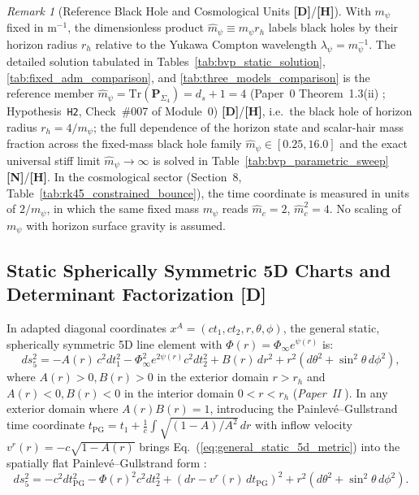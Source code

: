 \documentclass[11pt,a4paper]{article}
\newcommand{\catD}{\textbf{\textcolor{blue!75!black}{[D]}}}
\newcommand{\catH}{\textbf{\textcolor{orange!85!black}{[H]}}}
\newcommand{\catN}{\textbf{\textcolor{teal!75!black}{[N]}}}
\theoremstyle{definition}
\theoremstyle{remark}
\newtheorem{remark}[theorem]{Remark}
\begin{document}
\begin{remark}[Reference Black Hole and Cosmological Units \catD/\catH]
\label{rem:units}
With $m_\psi$ fixed in $\text{m}^{-1}$, the dimensionless product $\hat{m}_\psi \equiv m_\psi r_h$ labels black holes by their horizon radius $r_h$ relative to the Yukawa Compton wavelength $\lambda_\psi = m_\psi^{-1}$. The detailed solution tabulated in Tables~\ref{tab:bvp_static_solution}, \ref{tab:fixed_adm_comparison}, and \ref{tab:three_models_comparison} is the reference member $\hat{m}_\psi = \text{Tr}(\mathbf{P}_{\Sigma_4}) = d_s + 1 = 4$ (Paper~0 Theorem~1.3(ii) \cite{JV_Paper0}; Hypothesis~\texttt{H2}, Check~\#007 of Module~0) \catD/\catH, i.e.\ the black hole of horizon radius $r_h = 4/m_\psi$; the full dependence of the horizon state and scalar-hair mass fraction across the fixed-mass black hole family $\hat{m}_\psi \in [0.25, 16.0]$ and the exact universal stiff limit $\hat{m}_\psi \to \infty$ is solved in Table~\ref{tab:bvp_parametric_sweep} \catN/\catH. In the cosmological sector (Section~8, Table~\ref{tab:rk45_constrained_bounce}), the time coordinate is measured in units of $2/m_\psi$, in which the same fixed mass $m_\psi$ reads $\hat{m}_c = 2$, $\hat{m}_c^2 = 4$. No scaling of $m_\psi$ with horizon surface gravity is assumed.
\end{remark}

\subsection{\texorpdfstring{Static Spherically Symmetric 5D Charts and Determinant Factorization \catD}{Static Spherically Symmetric 5D Charts and Determinant Factorization}}

In adapted diagonal coordinates $x^A = (c t_1, c t_2, r, \theta, \phi)$, the general static, spherically symmetric 5D line element with $\Phi(r) = \Phi_{\infty} e^{\psi(r)}$ is:
\begin{equation}
  ds_5^2 = -A(r)\,c^2 dt_1^2 - \Phi_{\infty}^2 e^{2\psi(r)} c^2 dt_2^2 + B(r)\,dr^2 + r^2\left(d\theta^2 + \sin^2\theta\,d\phi^2\right),
  \label{eq:general_static_5d_metric}
\end{equation}
where $A(r) > 0, B(r) > 0$ in the exterior domain $r > r_h$ and $A(r) < 0, B(r) < 0$ in the interior domain $0 < r < r_h$ (\textit{Paper~II} \cite{JV_Paper2}). In any exterior domain where $A(r)B(r) = 1$, introducing the Painlev\'e--Gullstrand time coordinate $t_{\text{PG}} = t_1 + \frac{1}{c}\int\sqrt{(1 - A)/A^2}\,dr$ with inflow velocity $v^r(r) = -c\sqrt{1 - A(r)}$ brings Eq.~(\ref{eq:general_static_5d_metric}) into the spatially flat Painlev\'e--Gullstrand form \cite{Painleve1921,Gullstrand1922,HamiltonLisle2008}:
\begin{equation}
  ds_5^2 = -c^2 dt_{\text{PG}}^2 - \Phi(r)^2 c^2 dt_2^2 + \left(dr - v^r(r)\,dt_{\text{PG}}\right)^2 + r^2\left(d\theta^2 + \sin^2\theta\,d\phi^2\right).
  \label{eq:adm_gp_line_element}
\end{equation}
\end{document}
